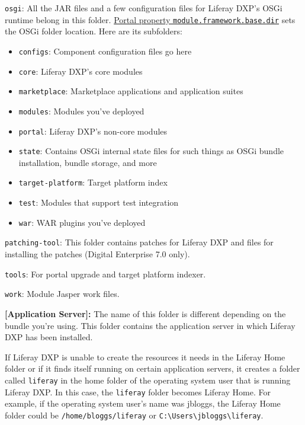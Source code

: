 \texttt{osgi}: All the JAR files and a few configuration files for
Liferay DXP's OSGi runtime belong in this folder.
\href{@platform-ref@/7.0-latest/propertiesdoc/portal.properties.html\#Module\%20Framework}{Portal
property \texttt{module.framework.base.dir}} sets the OSGi folder
location. Here are its subfolders:

\begin{itemize}
\tightlist
\item
  \texttt{configs}: Component configuration files go here
\item
  \texttt{core}: Liferay DXP's core modules
\item
  \texttt{marketplace}: Marketplace applications and application suites
\item
  \texttt{modules}: Modules you've deployed
\item
  \texttt{portal}: Liferay DXP's non-core modules
\item
  \texttt{state}: Contains OSGi internal state files for such things as
  OSGi bundle installation, bundle storage, and more
\item
  \texttt{target-platform}: Target platform index
\item
  \texttt{test}: Modules that support test integration
\item
  \texttt{war}: WAR plugins you've deployed
\end{itemize}

\texttt{patching-tool}: This folder contains patches for Liferay DXP and
files for installing the patches (Digital Enterprise 7.0 only).

\texttt{tools}: For portal upgrade and target platform indexer.

\texttt{work}: Module Jasper work files.

\textbf{{[}Application Server{]}:} The name of this folder is different
depending on the bundle you're using. This folder contains the
application server in which Liferay DXP has been installed.

If Liferay DXP is unable to create the resources it needs in the Liferay
Home folder or if it finds itself running on certain application
servers, it creates a folder called \texttt{liferay} in the home folder
of the operating system user that is running Liferay DXP. In this case,
the \texttt{liferay} folder becomes Liferay Home. For example, if the
operating system user's name was jbloggs, the Liferay Home folder could
be \texttt{/home/bloggs/liferay} or
\texttt{C:\textbackslash{}Users\textbackslash{}jbloggs\textbackslash{}liferay}.

